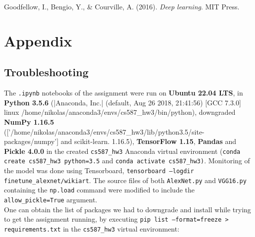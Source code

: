 \documentclass{article}
\def\code#1{\texttt{#1}}
\begin{document}
\pagebreak

\begin{thebibliography}{4}
	 Goodfellow, I., Bengio, Y., \& Courville, A. (2016). \textit{Deep learning}. MIT Press.
\end{thebibliography}

\pagebreak

\appendix

\section{Appendix}

\subsection{Troubleshooting}

The \code{.ipynb} notebooks of the assignment were run on \textbf{Ubuntu 22.04 LTS}, in \textbf{Python 3.5.6} (|Anaconda, Inc.| (default, Aug 26 2018, 21:41:56) [GCC 7.3.0] linux /home/nikolas/anaconda3/envs/cs587\_hw3/bin/python), downgraded \textbf{NumPy 1.16.5} (['/home/nikolas/anaconda3/envs/cs587\_hw3/lib/python3.5/site-packages/numpy'] and scikit-learn.
1.16.5), \textbf{TensorFlow 1.15}, \textbf{Pandas} and \textbf{Pickle 4.0.0} in the created \code{cs587\_hw3} Anaconda virtual environment (\code{conda create cs587\_hw3 python=3.5} and \code{conda activate cs587\_hw3)}. Monitoring of the model was done using Tensorboard, \code{tensorboard --logdir finetune\_alexnet/wikiart}. The source files of both \code{AlexNet.py} and \code{VGG16.py} containing the \code{np.load} command were modified to include the \code{allow\_pickle=True} argument. \\

 One can obtain the list of packages we had to downgrade and install while trying to get the assignment running, by executing \code{pip list --format=freeze > requirements.txt} in the \code{cs587\_hw3} virtual environment:
\end{document}
